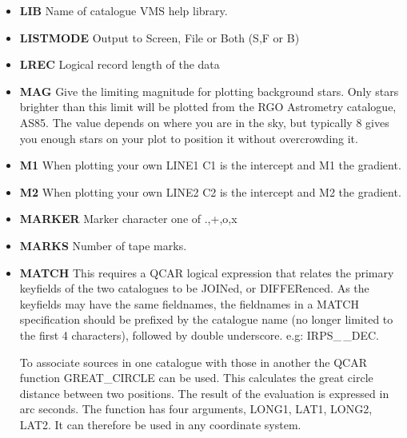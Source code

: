 \begin{description}
\begin{itemize}
\item {\bf LIB} Name of catalogue VMS help library.
\item{\bf LISTMODE} Output to Screen, File or Both (S,F or B)
\item{\bf LREC} Logical record length of the data
\item{\bf MAG} Give the limiting magnitude for plotting background stars.
Only stars brighter than this limit will be plotted from the RGO Astrometry
catalogue, AS85.
The value depends on where you are in the sky, but typically 8 gives you
enough stars on your plot to position it without overcrowding it.
\item{\bf M1} When plotting your own LINE1 C1
is the intercept and M1 the gradient.
\item{\bf M2} When plotting your own LINE2 C2
is the intercept and M2 the gradient.
\item {\bf MARKER} Marker character one of .,+,o,x
\item{\bf MARKS} Number of tape marks.
\item{\bf MATCH}
This requires a QCAR logical expression that relates the primary keyfields
of the two catalogues to be JOINed, or DIFFERenced.
As the keyfields may have the same fieldnames, the fieldnames in a MATCH
specification should be prefixed by the catalogue name (no longer limited to
the first 4 characters), followed by double underscore.  e.g:  IRPS\_\,\_DEC.

To associate sources in one catalogue with those in another the QCAR function
GREAT\_CIRCLE can be used.
This calculates the great circle distance between two positions.
The result of the evaluation is expressed in arc seconds.
The function has four arguments, LONG1, LAT1, LONG2, LAT2.
It can therefore be used in any coordinate system.


\end{itemize}
\end{description}
